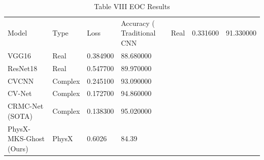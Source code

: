 \begin{table}
\caption{Table VIII EOC Results}
\begin{tabular}{llll}
\toprule
Model & Type & Loss & Accuracy (%
\midrule
Traditional CNN & Real & 0.331600 & 91.330000 \\
VGG16 & Real & 0.384900 & 88.680000 \\
ResNet18 & Real & 0.547700 & 89.970000 \\
CVCNN & Complex & 0.245100 & 93.090000 \\
CV-Net & Complex & 0.172700 & 94.860000 \\
CRMC-Net (SOTA) & Complex & 0.138300 & 95.020000 \\
PhysX-MKS-Ghost (Ours) & PhysX & 0.6026 & 84.39 \\
\bottomrule
\end{tabular}
\end{table}
